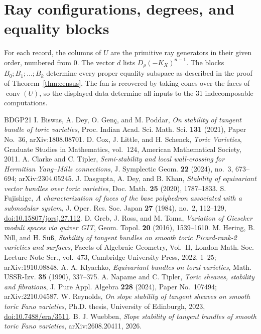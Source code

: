 \documentclass[11pt]{amsart}
\theoremstyle{definition}
\theoremstyle{remark}
\begin{document}
\appendix
\section{Ray configurations, degrees, and equality blocks}\label{app:data}
For each record, the columns of $U$ are the primitive ray generators
in their given order, numbered from $0$. The vector $d$ lists
$D_\rho(-K_X)^{n-1}$. The blocks $B_0;B_1;\ldots;B_k$ determine
every proper equality subspace as described in the proof of
Theorem~\ref{thm:census}. The fan is recovered by taking cones over
the faces of $\operatorname{conv}(U)$, so the displayed data determine
all inputs to the 31 indecomposable computations.


\begin{thebibliography}{BDGP21}
 I. Biswas, A. Dey, O. Gen\c c, and M. Poddar,
\emph{On stability of tangent bundle of toric varieties},
Proc. Indian Acad. Sci. Math. Sci. \textbf{131} (2021), Paper No.~36,
arXiv:1808.08701.
 D. Cox, J. Little, and H. Schenck,
\emph{Toric Varieties}, Graduate Studies in Mathematics, vol.~124,
American Mathematical Society, 2011.
 A. Clarke and C. Tipler,
\emph{Semi-stability and local wall-crossing for Hermitian Yang--Mills
connections}, J. Symplectic Geom. \textbf{22} (2024), no.~3,
673--694; arXiv:2304.05245.
 J. Dasgupta, A. Dey, and B. Khan,
\emph{Stability of equivariant vector bundles over toric varieties},
Doc. Math. \textbf{25} (2020), 1787--1833.
 S. Fujishige,
\emph{A characterization of faces of the base polyhedron associated
with a submodular system}, J. Oper. Res. Soc. Japan \textbf{27} (1984),
no.~2, 112--129,
\href{https://doi.org/10.15807/jorsj.27.112}{doi:10.15807/jorsj.27.112}.
 D. Greb, J. Ross, and M. Toma,
\emph{Variation of Gieseker moduli spaces via quiver GIT},
Geom. Topol. \textbf{20} (2016), 1539--1610.
 M. Hering, B. Nill, and H. S\"u\ss,
\emph{Stability of tangent bundles on smooth toric Picard-rank-2
varieties and surfaces}, Facets of Algebraic Geometry, Vol.~II,
London Math. Soc. Lecture Note Ser., vol.~473, Cambridge University
Press, 2022, 1--25; arXiv:1910.08848.
 A. A. Klyachko,
\emph{Equivariant bundles on toral varieties}, Math. USSR-Izv.
\textbf{35} (1990), 337--375.
 A. Napame and C. Tipler,
\emph{Toric sheaves, stability and fibrations}, J. Pure Appl. Algebra
\textbf{228} (2024), Paper No.~107494; arXiv:2210.04587.
 W. Reynolds,
\emph{On slope stability of tangent sheaves on smooth toric Fano
varieties}, Ph.D. thesis, University of Edinburgh, 2023,
\href{https://doi.org/10.7488/era/3511}{doi:10.7488/era/3511}.
 B. J. Wuebben,
\emph{Slope stability of tangent bundles of smooth toric Fano varieties},
arXiv:2608.20411, 2026.
\end{thebibliography}
\end{document}
